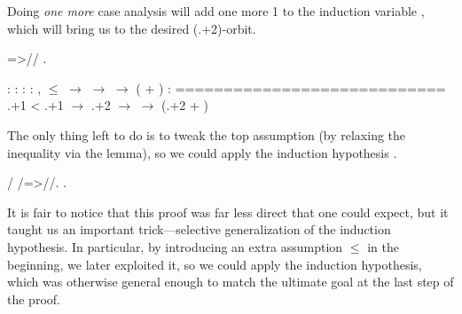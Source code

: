 \coqdocemptyline


Doing \textit{one more} case analysis will add one more 1 to the induction
variable , which will bring us to the desired (.+2)-orbit.


\begin{coqdoccode}
\coqdocemptyline
\coqdocnoindent
{}=>// .\coqdoceol
\coqdocemptyline
\end{coqdoccode}
\coqdoceol
\coqdocemptyline
\coqdocindent{1.00em}
 : \coqdoceol
\coqdocindent{1.00em}
 : \coqdoceol
\coqdocindent{1.00em}
 : \coqdockw{\ensuremath{\forall}}  : ,  \ensuremath{\le}  \ensuremath{\rightarrow}   \ensuremath{\rightarrow}   \ensuremath{\rightarrow}  ( + )\coqdoceol
\coqdocindent{1.00em}
 : \coqdoceol
\coqdocindent{1.00em}
============================\coqdoceol
\coqdocindent{1.50em}
.+1 < .+1 \ensuremath{\rightarrow}  .+2 \ensuremath{\rightarrow}   \ensuremath{\rightarrow}  (.+2 + )

\coqdocemptyline


The only thing left to do is to tweak the top assumption (by relaxing
the inequality via the  lemma), so we could apply the induction
hypothesis .


\begin{coqdoccode}
\coqdocemptyline
\coqdocnoindent
{} / /=>//.\coqdoceol
\coqdocnoindent
{}.\coqdoceol
\coqdocemptyline
\end{coqdoccode}


It is fair to notice that this proof was far less direct that one
could expect, but it taught us an important trick---selective
generalization of the induction hypothesis. In particular, by
introducing an extra assumption  \ensuremath{\le}  in the beginning, we later
exploited it, so we could apply the induction hypothesis, which was
otherwise general enough to match the ultimate goal at the last step
of the proof.






